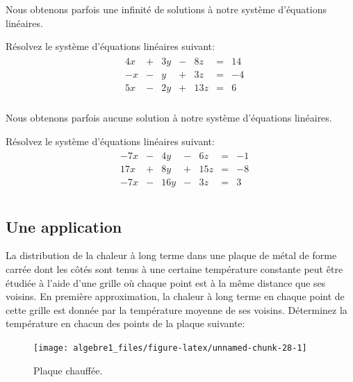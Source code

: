 \documentclass[]{book}
\theoremstyle{definition}
\theoremstyle{definition}
\theoremstyle{definition}
\theoremstyle{remark}
\let\BeginKnitrBlock\begin \let\EndKnitrBlock\end
\begin{document}
Nous obtenons parfois une infinité de solutions à notre système d'équations linéaires.

\BeginKnitrBlock{example}
\protect\hypertarget{exm:unnamed-chunk-26}{}{\label{exm:unnamed-chunk-26} }Résolvez le système d'équations linéaires suivant:
\begin{align*}
\begin{array}{cccccccc}
&4x&+&3y&-&8z&=&14\\
&-x&-&y&+&3z&=&-4\\
&5x&-&2y&+&13z&=&6\\
\end{array}
\end{align*}
\EndKnitrBlock{example}

Nous obtenons parfois aucune solution à notre système d'équations linéaires.

\BeginKnitrBlock{example}
\protect\hypertarget{exm:unnamed-chunk-27}{}{\label{exm:unnamed-chunk-27} }Résolvez le système d'équations linéaires suivant:
\begin{align*}
\begin{array}{cccccccc}
&-7x&-&4y&-&6z&=&-1\\
&17x&+&8y&+&15z&=&-8\\
&-7x&-&16y&-&3z&=&3\\
\end{array}
\end{align*}
\EndKnitrBlock{example}

\hypertarget{une-application}{%
\subsection{Une application}\label{une-application}}

\BeginKnitrBlock{example}
\protect\hypertarget{exm:plaque2d}{}{\label{exm:plaque2d} }La distribution de la chaleur à long terme dans une plaque de métal de forme carrée dont les côtés sont tenus à une certaine température constante peut être étudiée à l'aide d'une grille où chaque point est à la même distance que ses voisins. En première approximation, la chaleur à long terme en chaque point de cette grille est donnée par la température moyenne de ses voisins. Déterminez la température en chacun des points de la plaque suivante:
\EndKnitrBlock{example}

\begin{figure}

{\centering \texttt{[image: algebre1\_files/figure-latex/unnamed-chunk-28-1]} 

}

\caption{Plaque chauffée.}\label{fig:unnamed-chunk-28}
\end{figure}
\end{document}
